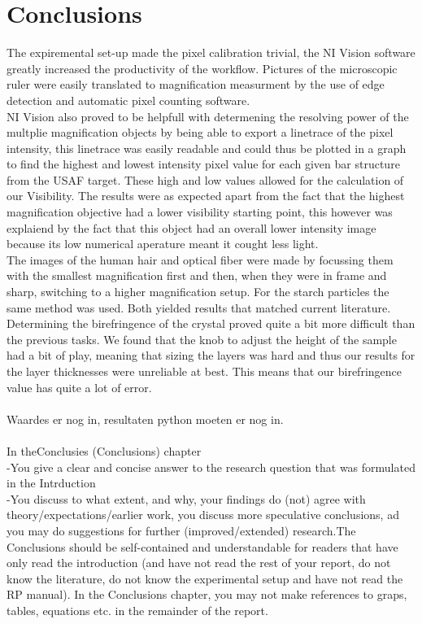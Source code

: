 \section{Conclusions}
The expiremental set-up made the pixel calibration trivial, the NI Vision software greatly increased the productivity of the workflow. Pictures of the microscopic ruler were easily translated to magnification measurment by the use of edge detection and automatic pixel counting software.\\
NI Vision also proved to be helpfull with determening the resolving power of the multplie magnification objects by being able to export a linetrace of the pixel intensity, this linetrace was easily readable and could thus be plotted in a graph to find the highest and lowest intensity pixel value for each given bar structure from the USAF target. These high and low values allowed for the calculation of our Visibility. The results were as expected apart from the fact that the highest magnification objective had a lower visibility starting point, this however was explaiend by the fact that this object had an overall lower intensity image because its low numerical aperature meant it cought less light.\\
The images of the human hair and optical fiber were made by focussing them with the smallest magnification first and then, when they were in frame and sharp, switching to a higher magnification setup. For the starch particles the same method was used. Both yielded results that matched current literature.\\
Determining the birefringence of the crystal proved quite a bit more difficult than the previous tasks. We found that the knob to adjust the height of the sample had a bit of play, meaning that sizing the layers was hard and thus our results for the layer thicknesses were unreliable at best. This means that our birefringence value has quite a lot of error.\\
\\
Waardes er nog in, resultaten python moeten er nog in.\\
\\








In theConclusies (Conclusions) chapter\\-You give a clear and concise answer to the research question that was formulated in the Intrduction\\-You discuss  to  what  extent,  and  why,  your  findings  do  (not)  agree  with  theory/expectations/earlier  work,   you   discuss   more   speculative   conclusions,   ad   you   may   do   suggestions   for   further   (improved/extended) research.The  Conclusions  should  be  self-contained  and  understandable  for  readers  that  have  only  read  the  introduction  (and  have  not  read the  rest  of  your    report,  do  not  know  the  literature,  do  not  know  the  experimental  setup  and  have  not  read  the  RP  manual).   In  the  Conclusions  chapter,  you  may  not  make  references to graps, tables, equations etc. in the remainder of the report.